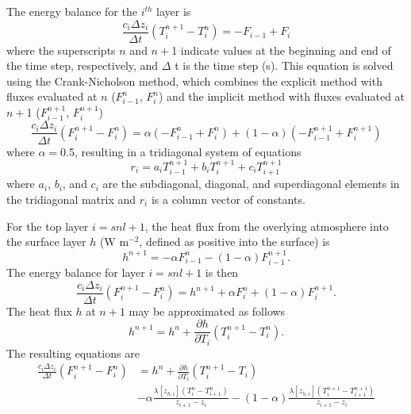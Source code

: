 \documentclass[12pt,authoryear]{elsarticle}
\numberwithin{equation}{section} %
\begin{document}
The energy balance for the $i^{th}$ layer is
\begin{equation}
\frac{c_{i}\Delta z_{i}}{\Delta t}(T_{i}^{n+1} - T_{i}^{n}) = -F_{i-1}+F_{i}
\end{equation}
where the superscripts $n$ and $n+$1 indicate values at the beginning and end of the time step, respectively, and $\Delta$ t is the time step (s). This equation is solved using the Crank-Nicholson method, which combines the explicit method with fluxes evaluated at $n$ ($F_{i-1}^{n}$, $F_{i}^{n}$) and the implicit method with fluxes evaluated at $n+$1 ($F_{i-1}^{n+1}$, $F_{i}^{n+1}$)
\begin{equation}
\frac{c_{i}\Delta z_{i}}{\Delta t}(F_{i}^{n+1} -F_{i}^{n})=\alpha(-F_{i-1}^{n}+F_{i}^{n})+(1-\alpha)(-F_{i-1}^{n+1}+F_{i}^{n+1})
\end{equation}
where $\alpha=$0.5, resulting in a tridiagonal system of equations
\begin{equation}
r_{i}=a_{i}T_{i-1}^{n+1}+b_{i}T_{i}^{n+1}+c_{i}T_{i+1}^{n+1}
\end{equation}
where $a_{i}$, $b_{i}$, and $c_{i}$ are the subdiagonal, diagonal, and superdiagonal elements in the tridiagonal matrix and $r_{i}$ is a column vector of constants.

For the top layer $i=snl+1$, the heat flux from the overlying atmosphere into the surface layer $h$ (W m$^{-2}$, defined as positive into the surface) is
\begin{equation}
h^{n+1}=-\alpha F_{i-1}^{n}-(1-\alpha)F_{i-1}^{n+1}.
\end{equation}
The energy balance for layer $i=snl+1$ is then
\begin{equation}
\frac{c_{i}\Delta z_{i}}{\Delta t}(F_{i}^{n+1} -F_{i}^{n})=h^{n+1}+\alpha F_{i}^{n} +(1-\alpha)F_{i}^{n+1}.
\end{equation}
The heat flux $h$ at $n+1$ may be approximated as follows
\begin{equation}
h^{n+1}=h^{n}+\frac{\partial h}{\partial T_{i}}(T_{i}^{n+1}-T_{i}^{n}).
\end{equation}
The resulting equations are
\begin{equation}
\label{eq:heat_fluex_final}
\begin{aligned}
\frac{c_{i}\Delta z_{i}}{\Delta t}(F_{i}^{n+1} -F_{i}^{n})&=h^{n}+\frac{\partial h}{\partial T_{i}}(T_{i}^{n+1}-T_{i}) \\
&-\alpha\frac{\lambda[z_{h,i}](T_{i}^{n}-T_{i+1}^{n})}{z_{i+1}-z_{i}}-(1-\alpha)\frac{\lambda[z_{h,i}](T_{i}^{n+1}-T_{i+1}^{n+1})}{z_{i+1}-z_{i}}
\end{aligned}
\end{equation}
\end{document}
